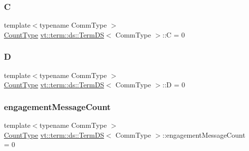 \subsubsection{\texorpdfstring{C}{C}}
{\footnotesize\ttfamily template$<$typename Comm\+Type $>$ \\
\hyperlink{structvt_1_1term_1_1ds_1_1_term_d_s_a54f4ebd7e1ecb59c32c0f5b03ef9f20b}{Count\+Type} \hyperlink{structvt_1_1term_1_1ds_1_1_term_d_s}{vt\+::term\+::ds\+::\+Term\+DS}$<$ Comm\+Type $>$\+::C = 0\hspace{0.3cm}{\ttfamily [protected]}}

\mbox{\label{structvt_1_1term_1_1ds_1_1_term_d_s_afcfe54a5e5844f7483cd730c9970fe36}} 
\subsubsection{\texorpdfstring{D}{D}}
{\footnotesize\ttfamily template$<$typename Comm\+Type $>$ \\
\hyperlink{structvt_1_1term_1_1ds_1_1_term_d_s_a54f4ebd7e1ecb59c32c0f5b03ef9f20b}{Count\+Type} \hyperlink{structvt_1_1term_1_1ds_1_1_term_d_s}{vt\+::term\+::ds\+::\+Term\+DS}$<$ Comm\+Type $>$\+::D = 0\hspace{0.3cm}{\ttfamily [protected]}}

\mbox{\label{structvt_1_1term_1_1ds_1_1_term_d_s_ad8d11aea5b48de393ba6f94c0ce8ed7e}} 
\subsubsection{\texorpdfstring{engagement\+Message\+Count}{engagementMessageCount}}
{\footnotesize\ttfamily template$<$typename Comm\+Type $>$ \\
\hyperlink{structvt_1_1term_1_1ds_1_1_term_d_s_a54f4ebd7e1ecb59c32c0f5b03ef9f20b}{Count\+Type} \hyperlink{structvt_1_1term_1_1ds_1_1_term_d_s}{vt\+::term\+::ds\+::\+Term\+DS}$<$ Comm\+Type $>$\+::engagement\+Message\+Count = 0\hspace{0.3cm}{\ttfamily [protected]}}

